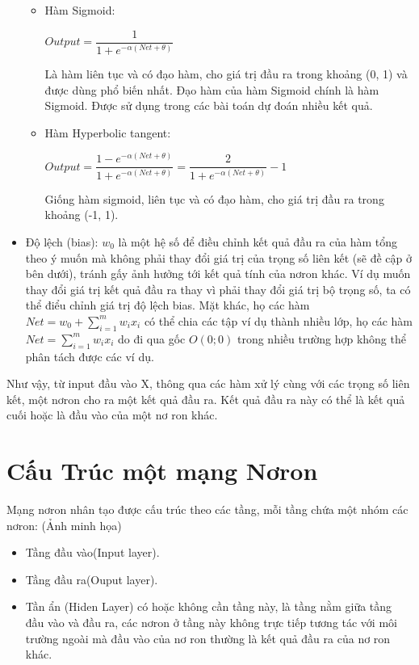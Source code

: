\documentclass[13pt, a4paper]{extreport}
\begin{document}
\begin{itemize}
\begin{itemize}
		\item Hàm Sigmoid:
		  \begin{center}
			$Output = \dfrac{1}{1 + e^{-\alpha(Net + \theta)}}$
		  \end{center}
		  Là hàm liên tục và có đạo hàm, cho giá trị đầu ra trong khoảng (0, 1) và được dùng phổ biến nhất. Đạo hàm của hàm Sigmoid chính là hàm Sigmoid. Được sử dụng trong các bài toán dự đoán nhiều kết quả.
		\item Hàm Hyperbolic tangent:
		   \begin{center}
			$Output = \dfrac{1 - e^{-\alpha(Net + \theta)}}{1 + e^{-\alpha(Net + \theta)}}
					= \dfrac{2}{1 + e^{-\alpha(Net + \theta)}} - 1$
		  \end{center}  
		 Giống hàm sigmoid, liên tục và có đạo hàm, cho giá trị đầu ra trong khoảng (-1, 1).  
	\end{itemize}
	\item Độ lệch (bias): $w_0$ là một hệ số để điều chỉnh kết quả đầu ra của hàm tổng theo ý muốn mà không phải thay đổi giá trị của trọng số liên kết (sẽ đề cập ở bên dưới), tránh gấy ảnh hưởng tới kết quả tính của nơron khác. Ví dụ muốn thay đổi giá trị kết quả đầu ra thay vì phải thay đổi giá trị bộ trọng số, ta có thể điểu chỉnh giá trị độ lệch bias. Mặt khác, họ các hàm $Net = w_0 + \sum\limits_{i=1}^m w_ix_i$ có thể chia các tập ví dụ thành nhiều lớp, họ các hàm $Net = \sum\limits_{i=1}^m w_ix_i$ do đi qua gốc $O(0; 0)$ trong nhiều trường hợp không thể phân tách được các ví dụ.
\end{itemize}

\indent Như vậy, từ input đầu vào X, thông qua các hàm xử lý cùng với các trọng số liên kết, một nơron cho ra một kết quả đầu ra. Kết quả đầu ra này có thể là kết quả cuối hoặc là đầu vào của một nơ ron khác.
\section{Cấu Trúc một mạng Nơron}
\indent Mạng nơron nhân tạo được cấu trúc theo các tầng, mỗi tầng chứa một nhóm các nơron: (Ảnh minh họa)
\begin{itemize}
\item Tầng đầu vào(Input layer).
\item Tầng đầu ra(Ouput layer).
\item Tần ẩn (Hiden Layer) có hoặc không cần tầng này, là tầng nằm giữa tầng đầu vào và đầu ra, các nơron ở tầng này không trực tiếp tương tác với môi trường ngoài mà đầu vào của nơ ron thường là kết quả đầu ra của nơ ron khác.
\end{itemize}
\end{document}
